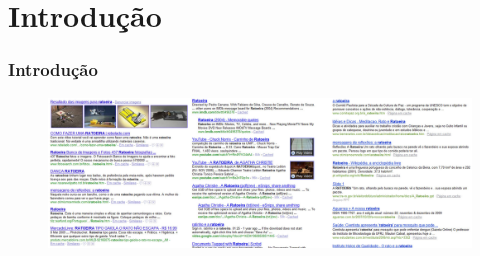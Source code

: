 \section{Introdu\c{c}\~ao}
	\begin{frame}
	\frametitle{Introdu\c{c}\~ao}
		\begin{figure}[htb]
			\begin{center}				
				\includegraphics[scale=0.095]{./figuras/ratoeira-g.jpg}				
			\end{center}			            
		\end{figure}
	\end{frame}

